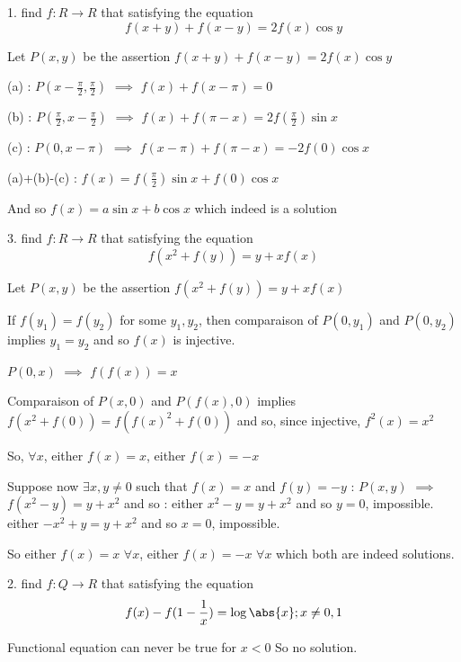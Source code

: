 \begin{solution}
	\begin{tcolorbox}1. find $f:R\rightarrow R$ that satisfying the equation
\[f(x+y)+f(x-y)=2f(x)\cos y\]\end{tcolorbox}
Let $P(x,y)$ be the assertion $f(x+y)+f(x-y)=2f(x)\cos y$

(a) : $P(x-\frac{\pi}2,\frac{\pi}2)$ $\implies$ $f(x)+f(x-\pi)=0$

(b) : $P(\frac{\pi}2,x-\frac{\pi}2)$ $\implies$ $f(x)+f(\pi-x)=2f(\frac{\pi}2)\sin x$

(c) : $P(0,x-\pi)$ $\implies$ $f(x-\pi)+f(\pi-x)=-2f(0)\cos x$

(a)+(b)-(c) : $f(x)=f(\frac{\pi}2)\sin x +f(0)\cos x$

And so $\boxed{f(x)=a\sin x+b\cos x}$ which indeed is a solution
\end{solution}



\begin{solution}
	\begin{tcolorbox}3. find $f:R\rightarrow R$ that satisfying the equation
\[f(x^2+f(y))=y+xf(x)\]\end{tcolorbox}
Let $P(x,y)$ be the assertion $f(x^2+f(y))=y+xf(x)$

If $f(y_1)=f(y_2)$ for some $y_1,y_2$, then comparaison of $P(0,y_1)$ and $P(0,y_2)$ implies $y_1=y_2$ and so $f(x)$ is injective.

$P(0,x)$ $\implies$ $f(f(x))=x$

Comparaison of $P(x,0)$ and $P(f(x),0)$ implies $f(x^2+f(0))=f(f(x)^2+f(0))$ and so, since injective, $f^2(x)=x^2$

So, $\forall x$, either $f(x)=x$, either $f(x)=-x$

Suppose now $\exists x,y\ne 0$ such that $f(x)=x$ and $f(y)=-y$ : $P(x,y)$ $\implies$ $f(x^2-y)=y+x^2$ and so :
either $x^2-y=y+x^2$ and so $y=0$, impossible.
either $-x^2+y=y+x^2$ and so $x=0$, impossible.

So either $\boxed{f(x)=x}$ $\forall x$, either $\boxed{f(x)=-x}$ $\forall x$ which both are indeed solutions.
\end{solution}



\begin{solution}
	\begin{tcolorbox}2. find $f:Q\rightarrow R$ that satisfying the equation
\[f(x)-f(1-\frac{1}{x})=\log \abs{x};x\not=0,1\]\end{tcolorbox}
Functional equation can never be true for $x<0$
So no solution.
\end{solution}



